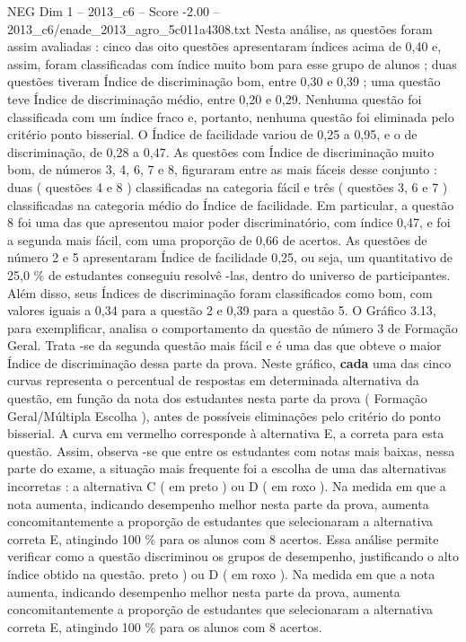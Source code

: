 \begin{textsample}{NEG Dim 1 – 2013\_c6 – Score -2.00 – 2013\_c6/enade\_2013\_agro\_5c011a4308.txt}
Nesta análise, as questões foram assim avaliadas : cinco das oito questões apresentaram índices acima de 0,40 e, assim, foram classificadas com índice muito bom para esse grupo de alunos ; duas questões tiveram Índice de discriminação bom, entre 0,30 e 0,39 ; uma questão teve Índice de discriminação médio, entre 0,20 e 0,29.
Nenhuma questão foi classificada com um índice fraco e, portanto, nenhuma questão foi eliminada pelo critério ponto bisserial.
O Índice de facilidade variou de 0,25 a 0,95, e o de discriminação, de 0,28 a 0,47.
As questões com Índice de discriminação muito bom, de números 3, 4, 6, 7 e 8, figuraram entre as mais fáceis desse conjunto : duas ( questões 4 e 8 ) classificadas na categoria fácil e três ( questões 3, 6 e 7 ) classificadas na categoria médio do Índice de facilidade.
Em particular, a questão 8 foi uma das que apresentou maior poder discriminatório, com índice 0,47, e foi a segunda mais fácil, com uma proporção de 0,66 de acertos.
As questões de número 2 e 5 apresentaram Índice de facilidade 0,25, ou seja, um quantitativo de 25,0 \% de estudantes conseguiu resolvê -las, dentro do universo de participantes.
Além disso, seus Índices de discriminação foram classificados como bom, com valores iguais a 0,34 para a questão 2 e 0,39 para a questão 5.
O Gráfico 3.13, para exemplificar, analisa o comportamento da questão de número 3 de Formação Geral.
Trata -se da segunda questão mais fácil e é uma das que obteve o maior Índice de discriminação dessa parte da prova.
Neste gráfico, \textbf{cada} uma das cinco curvas representa o percentual de respostas em determinada alternativa da questão, em função da nota dos estudantes nesta parte da prova ( Formação Geral/Múltipla Escolha ), antes de possíveis eliminações pelo critério do ponto bisserial.
A curva em vermelho corresponde à alternativa E, a correta para esta questão.
Assim, observa -se que entre os estudantes com notas mais baixas, nessa parte do exame, a situação mais frequente foi a escolha de uma das alternativas incorretas : a alternativa C ( em preto ) ou D ( em roxo ).
Na medida em que a nota aumenta, indicando desempenho melhor nesta parte da prova, aumenta concomitantemente a proporção de estudantes que selecionaram a alternativa correta E, atingindo 100 \% para os alunos com 8 acertos.
Essa análise permite verificar como a questão discriminou os grupos de desempenho, justificando o alto índice obtido na questão. preto ) ou D ( em roxo ).
Na medida em que a nota aumenta, indicando desempenho melhor nesta parte da prova, aumenta concomitantemente a proporção de estudantes que selecionaram a alternativa correta E, atingindo 100 \% para os alunos com 8 acertos.

\end{textsample}
